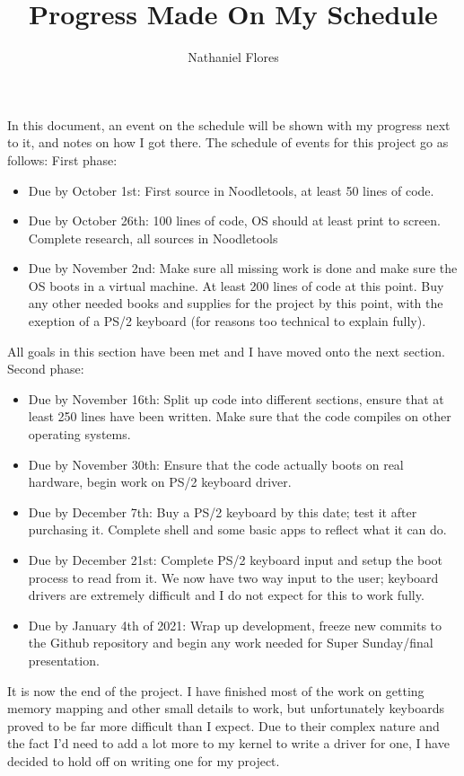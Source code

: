\documentclass[a4paper,10pt]{article}
\title{Progress Made On My Schedule}
\author{Nathaniel Flores}
\begin{document}
\maketitle
In this document, an event on the schedule will be shown with my progress next to it, and notes on how I got there. The schedule of events for this project go as follows:
\newline
\newline
First phase:
\begin{itemize}
 \item Due by October 1st: First source in Noodletools, at least 50 lines of code.
 \item Due by October 26th: 100 lines of code, OS should at least print to screen. Complete research, all sources in Noodletools
 \item Due by November 2nd: Make sure all missing work is done and make sure the OS boots in a virtual machine. At least 200 lines of code at this point. Buy any other needed books and supplies for the project by this point, with the exeption of a PS/2 keyboard (for reasons too technical to explain fully).
\end{itemize}
All goals in this section have been met and I have moved onto the next section.
Second phase:
\begin{itemize}
 \item Due by November 16th: Split up code into different sections, ensure that at least 250 lines have been written. Make sure that the code compiles on other operating systems.
 \item Due by November 30th: Ensure that the code actually boots on real hardware, begin work on PS/2 keyboard driver.
 \item Due by December 7th: Buy a PS/2 keyboard by this date; test it after purchasing it. Complete shell and some basic apps to reflect what it can do.
 \item Due by December 21st: Complete PS/2 keyboard input and setup the boot process to read from it. We now have two way input to the user; keyboard drivers are extremely difficult and I do not expect for this to work fully.
 \item Due by January 4th of 2021: Wrap up development, freeze new commits to the Github repository and begin any work needed for Super Sunday/final presentation.
\end{itemize}
It is now the end of the project. I have finished most of the work on getting memory mapping and other small details to work, but unfortunately keyboards proved to be far more difficult than I expect. Due to their complex nature and the fact I'd need to add a lot more to my kernel to write a driver for one, I have decided to hold off on writing one for my project.
\end{document}
